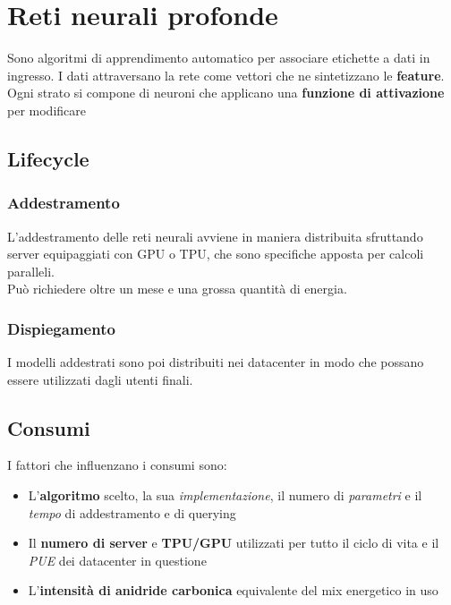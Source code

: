 \newpage
\section{Reti neurali profonde}
Sono algoritmi di apprendimento automatico per associare etichette a dati in ingresso. I dati attraversano la rete come vettori che ne sintetizzano le \textbf{feature}. Ogni strato si compone di neuroni che applicano una \textbf{funzione di attivazione} per modificare
\subsection{Lifecycle}
\subsubsection{Addestramento}
L'addestramento delle reti neurali avviene in maniera distribuita sfruttando server equipaggiati con GPU o TPU, che sono specifiche apposta per calcoli paralleli.\\
Può richiedere oltre un mese e una grossa quantità di energia.
\subsubsection{Dispiegamento}
I modelli addestrati sono poi distribuiti nei datacenter in modo che possano essere utilizzati dagli utenti finali.

\subsection{Consumi}
I fattori che influenzano i consumi sono:
\begin{itemize}
	\item L'\textbf{algoritmo} scelto, la sua \textit{implementazione}, il numero di \textit{parametri} e il \textit{tempo} di addestramento e di querying
	\item Il \textbf{numero di server} e \textbf{TPU/GPU} utilizzati per tutto il ciclo di vita e il \textit{PUE} dei datacenter in questione
	\item L'\textbf{intensità di anidride carbonica} equivalente del mix energetico in uso
\end{itemize}
